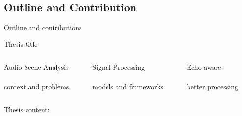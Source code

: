\subsection*{Outline and Contribution}

\begin{frame}{Outline and contributions}

    \begin{block}{Thesis title}

        \vspace*{2mm}
        \begin{columns}[onlytextwidth]
            \begin{column}[T]{0.3\linewidth}
                \centering
                \alert{Audio Scene Analysis}
                \\\downarrow
                \\context and problems
            \end{column}\hfill\pause
            \begin{column}[T]{0.3\linewidth}
                \centering
                \alert{Signal Processing}
                \\\downarrow
                \\models and frameworks
            \end{column}\hfill\pause
            \begin{column}[T]{0.3\linewidth}
                \centering
                \alert{Echo-aware}
                \\\downarrow
                \\better processing
            \end{column}\hfill
        \end{columns}
    \end{block}
    \pause

    \vfill
    \begin{block}{Thesis content:}


\end{block}
\end{frame}
